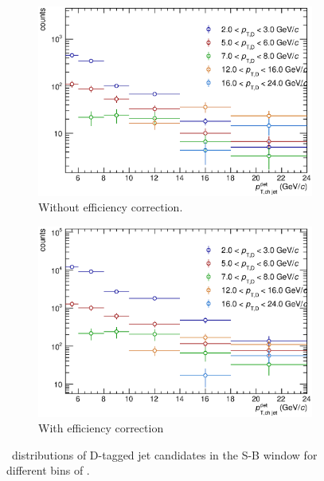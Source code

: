 \begin{figure}[tbh]
\centering
\begin{subfigure}{0.49\textwidth}
  \centering
  \includegraphics[width=1.0\linewidth]{img/HQ16_Simulation_SBSpectra}
  \caption{Without efficiency correction.}
\end{subfigure}
\begin{subfigure}{0.49\textwidth}
  \centering
  \includegraphics[width=1.0\linewidth]{img/HQ16_Simulation_SBSpectra_Eff}
  \caption{With efficiency correction}
\end{subfigure}
\caption{\ptchjetdet\ distributions of D-tagged jet candidates in the S-B window for different bins of \ptd.}
\label{fig:SBSpectra}
\end{figure}

